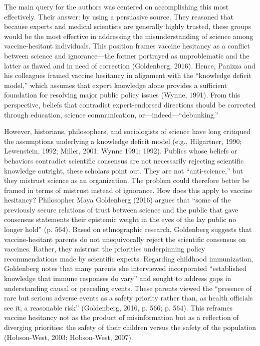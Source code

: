 \documentclass[authordate, reflection,issue]{jote-new-article}
\begin{document}
	The main query for the authors was centered on accomplishing this most effectively. Their answer: by using a persuasive source. They reasoned that because experts and medical scientists are generally highly trusted, these groups would be the most effective in addressing the misunderstanding of science among vaccine-hesitant individuals. This position frames vaccine hesitancy as a conflict between science and ignorance—the former portrayed as unproblematic and the latter as flawed and in need of correction (Goldenberg, 2016). Hence, Panizza and his colleagues framed vaccine hesitancy in alignment with the “knowledge deficit model,” which assumes that expert knowledge alone provides a sufficient foundation for resolving major public policy issues (Wynne, 1991). From this perspective, beliefs that contradict expert-endorsed directions should be corrected through education, science communication, or—indeed—“debunking.”







	However, historians, philosophers, and sociologists of science have long critiqued the assumptions underlying a knowledge deficit model (e.g., Hilgartner, 1990; Lewenstein, 1992; Miller, 2001; Wynne 1991; 1992). Publics whose beliefs or behaviors contradict scientific consensus are not necessarily rejecting scientific knowledge outright, these scholars point out. They are not “anti-science,” but they mistrust science as an organization. The problem could therefore better be framed in terms of mistrust instead of ignorance. How does this apply to vaccine hesitancy? Philosopher Maya Goldenberg (2016) argues that “some of the previously secure relations of trust between science and the public that gave consensus statements their epistemic weight in the eyes of the lay public no longer hold” (p. 564). Based on ethnographic research, Goldenberg suggests that vaccine-hesitant parents do not unequivocally reject the scientific consensus on vaccines. Rather, they mistrust the priorities underpinning policy recommendations made by scientific experts. Regarding childhood immunization, Goldenberg notes that many parents she interviewed incorporated “established knowledge that immune responses do vary” and sought to address gaps in understanding causal or preceding events. These parents viewed the “presence of rare but serious adverse events as a safety priority rather than, as health officials see it, a reasonable risk” (Goldenberg, 2016, p. 566; p. 564). This reframes vaccine hesitancy not as the product of misinformation but as a reflection of diverging priorities: the safety of their children versus the safety of the population (Hobson-West, 2003; Hobson-West, 2007).
\end{document}
